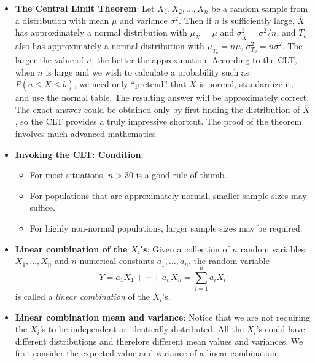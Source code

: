 \documentclass{report}
\begin{document}
\begin{itemize}
            \pagebreak 
        \item \textbf{The Central Limit Theorem}:
            Let \(X_1, X_2, \ldots, X_n\) be a random sample from a distribution with mean \(\mu\) and variance \(\sigma^2\). Then if \(n\) is sufficiently large, \(\overline{X}\) has approximately a normal distribution with \(\mu_{\overline{X}} = \mu\) and \(\sigma_{\overline{X}}^2 = \sigma^2 / n\), and \(T_o\) also has approximately a normal distribution with \(\mu_{T_o} = n\mu\), \(\sigma_{T_o}^2 = n\sigma^2\). The larger the value of \(n\), the better the approximation.
            \bigbreak \noindent 
            According to the CLT, when \(n\) is large and we wish to calculate a probability such as \(P(a \leq \overline{X} \leq b)\), we need only “pretend” that \(\overline{X}\) is normal, standardize it, and use the normal table. The resulting answer will be approximately correct. The exact answer could be obtained only by first finding the distribution of \(\overline{X}\), so the CLT provides a truly impressive shortcut. The proof of the theorem involves much advanced mathematics.
            \bigbreak \noindent 
        \item \textbf{Invoking the CLT: Condition}:
            \begin{itemize}
                \item For most situations, $n > 30$ is a good rule of thumb.
                \item For populations that are approximately normal, smaller sample sizes may suffice.
                \item For highly non-normal populations, larger sample sizes may be required.
            \end{itemize}
        \item \textbf{Linear combination of the $X_{i}$'s}:
            Given a collection of \(n\) random variables \(X_1, \ldots, X_n\) and \(n\) numerical constants \(a_1, \ldots, a_n\), the random variable
            \[
                Y = a_1 X_1 + \cdots + a_n X_n = \sum_{i=1}^{n} a_i X_i
            \]
            is called a \textit{linear combination} of the \(X_i\)'s.
        \item \textbf{Linear combination mean and variance}:
            Notice that we are not requiring the \( X_i \)'s to be independent or identically distributed. All the \( X_i \)'s could have different distributions and therefore different mean values and variances. We first consider the expected value and variance of a linear combination.

\end{itemize}
\end{document}
